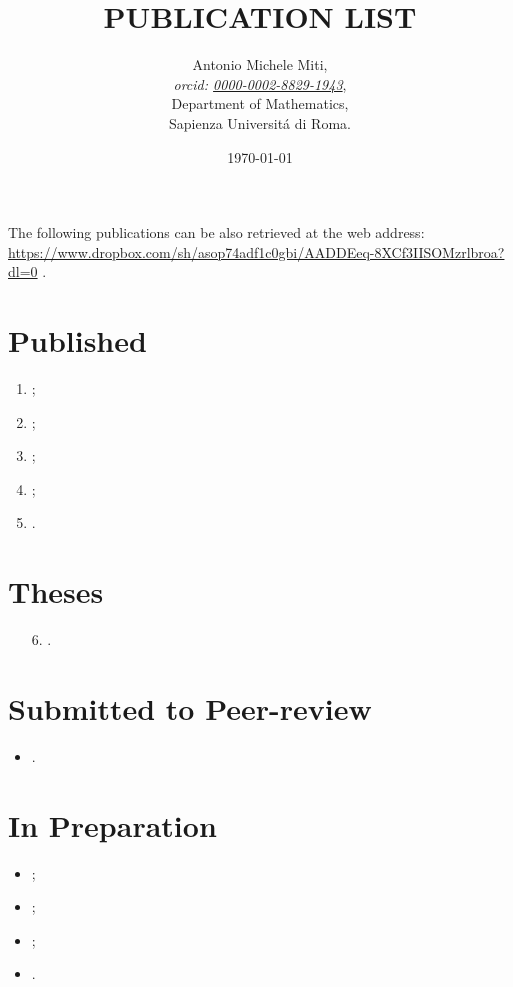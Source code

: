 \documentclass[a4paper]{article}
\title{PUBLICATION LIST}
\date{\today}
\author{
	Antonio Michele Miti,\\
	\emph{orcid: \href{https://orcid.org/0000-0002-8829-1943}{0000-0002-8829-1943}},
	\\
	Department of Mathematics,\\
	Sapienza Universit\'a di Roma.
}
\begin{document}
  

	\maketitle

	\noindent
  The following publications can be also retrieved at the web address:
  \\ 
  \url{https://www.dropbox.com/sh/asop74adf1c0gbi/AADDEeq-8XCf3IISOMzrlbroa?dl=0}
  .


  \section*{Published}
	  \begin{enumerate}
 	   \item {};	  
	   \item {};		
 	   \item {};
 	   \item {};
 	   \item {}.
	  \end{enumerate}

  \section*{Theses}
	  \begin{itemize}
 	   \item[6.] .
	  \end{itemize}



  \section*{Submitted to Peer-review}
	  \begin{itemize}
    	   \item {}.
	  \end{itemize}

  
  \section*{In Preparation}
	  \begin{itemize}
    	\item {};
    	\item {};
		\item {};
    	\item {}.
	  \end{itemize}

  
\end{document}
